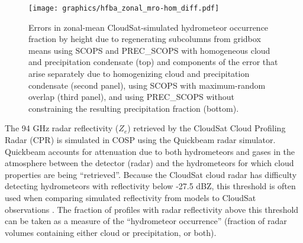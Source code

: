 \begin{figure}[tp]
\centering
\texttt{[image: graphics/hfba\_zonal\_mro-hom\_diff.pdf]}
\caption{\label{fig:hfba_zonal_mro_diff}Errors in zonal-mean
CloudSat-simulated hydrometeor occurrence fraction by height due to
regenerating subcolumns from gridbox means using SCOPS and PREC\_SCOPS
with homogeneous cloud and precipitation condensate (top) and components
of the error that arise separately due to homogenizing cloud and
precipitation condensate (second panel), using SCOPS with maximum-random
overlap (third panel), and using PREC\_SCOPS without constraining the
resulting precipitation fraction
(bottom).}\label{fig:hfbaux5fzonalux5fmroux5fdiff}
\end{figure}

The 94 GHz radar reflectivity (\(Z_e\)) retrieved by the CloudSat Cloud
Profiling Radar (CPR) is simulated in COSP using the Quickbeam
\citep{haynes_et_al_2007} radar simulator. Quickbeam accounts for
attenuation due to both hydrometeors and gases in the atmosphere between
the detector (radar) and the hydrometeors for which cloud properties are
being ``retrieved''. Because the CloudSat cloud radar has difficulty
detecting hydrometeors with reflectivity below -27.5 dBZ, this threshold
is often used when comparing simulated reflectivity from models to
CloudSat observations \citep{marchand_et_al_2009}. The fraction of
profiles with radar reflectivity above this threshold can be taken as a
measure of the ``hydrometeor occurrence'' (fraction of radar volumes
containing either cloud or precipitation, or both).

